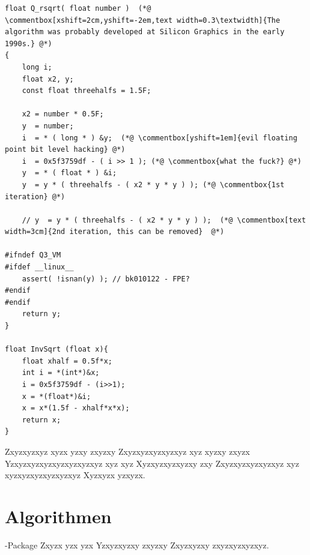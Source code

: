 \lstset{language=C}
\begin{lstlisting}[caption={Fast inverse square root is a \code{method} of calculating the reciprocal (or multiplicative inverse) of a square root for a 32-bit floating point number in IEEE 754 floating point format. The algorithm was probably developed at Silicon Graphics in the early 1990s, and an implementation appeared in 1999 in the Quake III Arena source code, but the method did not appear on public forums such as Usenet until 2002 or 2003. At the time, the primary advantage of the algorithm came from avoiding computationally expensive floating point operations in favor of integer operations. Inverse square roots are used to compute angles of incidence and reflection for lighting and shading in computer graphics.}, label=code:two]
float Q_rsqrt( float number )  (*@ \commentbox[xshift=2cm,yshift=-2em,text width=0.3\textwidth]{The algorithm was probably developed at Silicon Graphics in the early 1990s.} @*)
{
	long i;
	float x2, y;
	const float threehalfs = 1.5F;
	
	x2 = number * 0.5F;
	y  = number;
	i  = * ( long * ) &y;  (*@ \commentbox[yshift=1em]{evil floating point bit level hacking} @*) 
	i  = 0x5f3759df - ( i >> 1 ); (*@ \commentbox{what the fuck?} @*)
	y  = * ( float * ) &i;
	y  = y * ( threehalfs - ( x2 * y * y ) ); (*@ \commentbox{1st iteration} @*)
	
	// y  = y * ( threehalfs - ( x2 * y * y ) );  (*@ \commentbox[text width=3cm]{2nd iteration, this can be removed}  @*)
	
#ifndef Q3_VM
#ifdef __linux__
	assert( !isnan(y) ); // bk010122 - FPE?
#endif
#endif
	return y;
}
	
float InvSqrt (float x){
	float xhalf = 0.5f*x;
	int i = *(int*)&x;
	i = 0x5f3759df - (i>>1);
	x = *(float*)&i;
	x = x*(1.5f - xhalf*x*x);
	return x;
}
\end{lstlisting}

Zxyzxyzxyz xyzx yzxy zxyzxy Zxyzxyzxyzxyzxyz xyz xyzxy zxyzx Yzxyzxyzxyzxyzxyzxyzxyz xyz xyz Xyzxyzxyzxyzxy zxy Zxyzxyzxyzxyzxyz xyz xyzxyzxyzxyzxyzxyz Xyzxyzx yzxyzx.

\section{Algorithmen}

-Package Zxyzx yzx yzx Yzxyzxyzxy zxyzxy Zxyzxyzxy zxyzxyzxyzxyz. %

